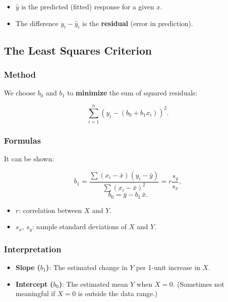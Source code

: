 \documentclass[10pt]{extarticle}
\begin{document}
\begin{itemize}
    \item $\hat{y}$ is the predicted (fitted) response for a given $x$.
    \item The difference $y_i - \hat{y}_i$ is the \textbf{residual} (error in prediction).
\end{itemize}



\subsection{The Least Squares Criterion}

\subsubsection{Method}

We choose $b_0$ and $b_1$ to \textbf{minimize} the sum of squared residuals:

\[
    \sum_{i=1}^n \left(y_i - \left(b_0 + b_1 x_i\right)\right)^2.
\]

\subsubsection{Formulas}

It can be shown:

\[
    b_1 = \frac{\sum (x_i - \bar{x})(y_i - \bar{y})}{\sum (x_i - \bar{x})^2}
    = r \frac{s_y}{s_x},
\]
\[
    b_0 = \bar{y} - b_1\,\bar{x}.
\]

\begin{itemize}
    \item $r$: correlation between $X$ and $Y$.
    \item $s_x$, $s_y$: sample standard deviations of $X$ and $Y$.
\end{itemize}

\subsubsection{Interpretation}

\begin{itemize}
    \item \textbf{Slope ($b_1$)}: The estimated change in $Y$ per 1-unit increase in $X$.
    \item \textbf{Intercept ($b_0$)}: The estimated mean $Y$ when $X=0$. (Sometimes not meaningful if $X=0$ is outside the data range.)
\end{itemize}
\end{document}
